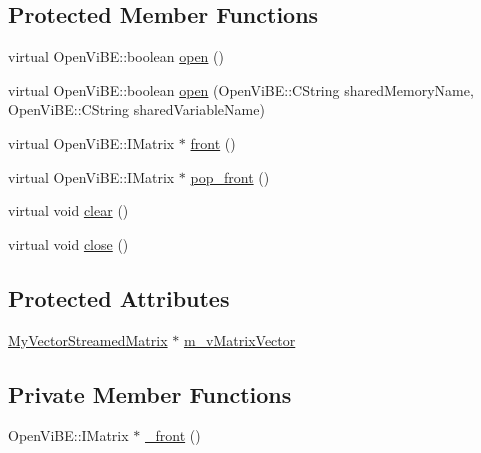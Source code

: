 \subsection*{Protected Member Functions}
\begin{DoxyCompactItemize}
\item 
virtual OpenViBE::boolean \hyperlink{classOpenViBEApplications_1_1SharedMatrixReader_a73ca66cbfaa1ba22a158b1f895bc6d3f}{open} ()
\item 
virtual OpenViBE::boolean \hyperlink{classOpenViBEApplications_1_1SharedMatrixReader_a07f8e625c9739f0b90d1025bdcd29753}{open} (OpenViBE::CString sharedMemoryName, OpenViBE::CString sharedVariableName)
\item 
virtual OpenViBE::IMatrix $\ast$ \hyperlink{classOpenViBEApplications_1_1SharedMatrixReader_aa7edc606ac7c0b4178c6b6dbb065e205}{front} ()
\item 
virtual OpenViBE::IMatrix $\ast$ \hyperlink{classOpenViBEApplications_1_1SharedMatrixReader_aea827c562147152dc1b7ae0f47079702}{pop\_\-front} ()
\item 
virtual void \hyperlink{classOpenViBEApplications_1_1SharedMatrixReader_ac6a8bb88dd7756e2aef20726c8ae17ab}{clear} ()
\item 
virtual void \hyperlink{classOpenViBEApplications_1_1SharedMatrixReader_ab51950fa462122467d721930c51ead07}{close} ()
\end{DoxyCompactItemize}
\subsection*{Protected Attributes}
\begin{DoxyCompactItemize}
\item 
\hyperlink{namespaceOpenViBEApplications_a49e9170dae207ef828da8396979a89da}{MyVectorStreamedMatrix} $\ast$ \hyperlink{classOpenViBEApplications_1_1SharedMatrixReader_a1709d70c6942fc18af57efc7142d5d17}{m\_\-vMatrixVector}
\end{DoxyCompactItemize}
\subsection*{Private Member Functions}
\begin{DoxyCompactItemize}
\item 
OpenViBE::IMatrix $\ast$ \hyperlink{classOpenViBEApplications_1_1SharedMatrixReader_a0cc505407d6f525f7d4940a2dc8b6f22}{\_\-front} ()
\end{DoxyCompactItemize}



